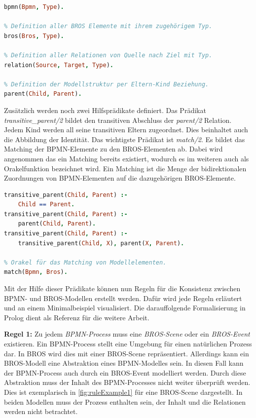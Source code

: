 \begin{lstlisting}[language=Prolog, caption=Definitionen der Faktenbasis, label=lst:definition_facts]
% Definition aller BPMN Elemente mit ihrem zugehörigem Typ.
bpmn(Bpmn, Type).

% Definition aller BROS Elemente mit ihrem zugehörigem Typ.
bros(Bros, Type).

% Definition aller Relationen von Quelle nach Ziel mit Typ.
relation(Source, Target, Type).

% Definition der Modellstruktur per Eltern-Kind Beziehung.
parent(Child, Parent).
\end{lstlisting}

Zusätzlich werden noch zwei Hilfsprädikate definiert.
Das Prädikat \emph{transitive\_parent/2} bildet den transitiven Abschluss der \emph{parent/2} Relation.
Jedem Kind werden all seine transitiven Eltern zugeordnet.
Dies beinhaltet auch die Abbildung der Identität.
Das wichtigste Prädikat ist \emph{match/2}.
Es bildet das Matching der BPMN-Elemente zu den BROS-Elementen ab.
Dabei wird angenommen das ein Matching bereits existiert, wodurch es im weiteren auch als Orakelfunktion bezeichnet wird.
Ein Matching ist die Menge der bidirektionalen Zuordnungen von BPMN-Elementen auf die dazugehörigen BROS-Elemente. 

\begin{lstlisting}[language=Prolog, caption=Definitionen der weiterführenden Regeln, label=lst:definition_predicats]
% Transitiver Abschluss der Modellstruktur.
transitive_parent(Child, Parent) :- 
    Child == Parent.
transitive_parent(Child, Parent) :- 
    parent(Child, Parent).
transitive_parent(Child, Parent) :- 
    transitive_parent(Child, X), parent(X, Parent).

% Orakel für das Matching von Modellelementen.
match(Bpmn, Bros).
\end{lstlisting}

Mit der Hilfe dieser Prädikate können nun Regeln für die Konsistenz zwischen BPMN- und BROS-Modellen erstellt werden.
Dafür wird jede Regeln erläutert und an einem Minimalbeispiel visualisiert.
Die darauffolgende Formalisierung in Prolog dient als Referenz für die weitere Arbeit.

\textbf{Regel 1:} 
Zu jedem \emph{BPMN-Process} muss eine \emph{BROS-Scene} oder ein \emph{BROS-Event} existieren.
Ein BPMN-Process stellt eine Umgebung für einen natürlichen Prozess dar.
In BROS wird dies mit einer BROS-Scene repräsentiert.
Allerdings kann ein BROS-Modell eine Abstraktion eines BPMN-Modelles sein.
In diesen Fall kann der BPMN-Process auch durch ein BROS-Event modelliert werden.
Durch diese Abstraktion muss der Inhalt des BPMN-Processes nicht weiter überprüft werden.
Dies ist exemplarisch in \cref{fig:ruleExample1} für eine BROS-Scene dargestellt.
In beiden Modellen muss der Prozess enthalten sein, der Inhalt und die Relationen werden nicht betrachtet.


